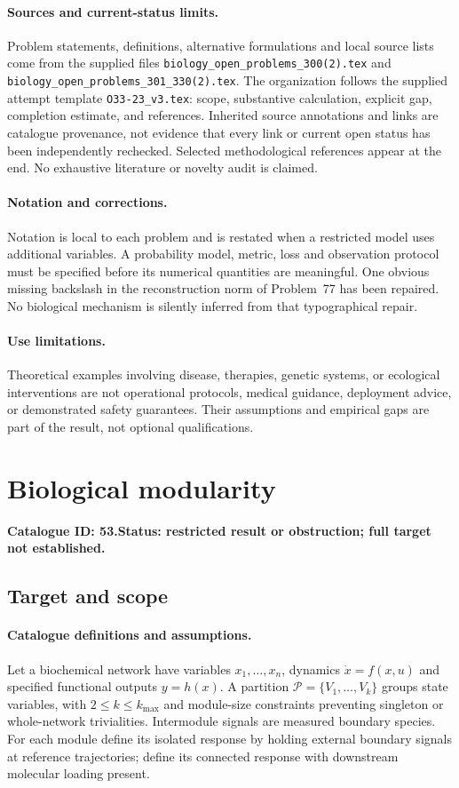 \documentclass[11pt]{article}
\begin{document}
\paragraph{Sources and current-status limits.}
Problem statements, definitions, alternative formulations and local source lists
come from the supplied files
\texttt{biology\_open\_problems\_300(2).tex} and
\texttt{biology\_open\_problems\_301\_330(2).tex}.
The organization follows the supplied attempt template
\texttt{O33-23\_v3.tex}: scope, substantive calculation, explicit gap,
completion estimate, and references. Inherited source annotations and links are
catalogue provenance, not evidence that every link or current open status has
been independently rechecked. Selected methodological references appear at the
end. No exhaustive literature or novelty audit is claimed.

\paragraph{Notation and corrections.}
Notation is local to each problem and is restated when a restricted model uses
additional variables. A probability model, metric, loss and observation protocol
must be specified before its numerical quantities are meaningful. One obvious
missing backslash in the reconstruction norm of Problem~77 has been repaired.
No biological mechanism is silently inferred from that typographical repair.

\paragraph{Use limitations.}
Theoretical examples involving disease, therapies, genetic systems, or ecological
interventions are not operational protocols, medical guidance, deployment advice,
or demonstrated safety guarantees. Their assumptions and empirical gaps are part
of the result, not optional qualifications.

\setcounter{section}{52}
\section{Biological modularity}
\label{prob:053}
\noindent\textbf{Catalogue ID: 53.}\quad \textbf{Status: restricted result or obstruction; full target not established.}
\subsection{Target and scope}
\paragraph{Catalogue definitions and assumptions.}
Let a biochemical network have variables $x_1,\ldots,x_n$, dynamics $\dot x=f(x,u)$ and specified functional outputs $y=h(x)$. A partition $\mathcal P=\{V_1,\ldots,V_k\}$ groups state variables, with $2\le k\le k_{\max}$ and module-size constraints preventing singleton or whole-network trivialities. Intermodule signals are measured boundary species. For each module define its isolated response by holding external boundary signals at reference trajectories; define its connected response with downstream molecular loading present.
\end{document}
